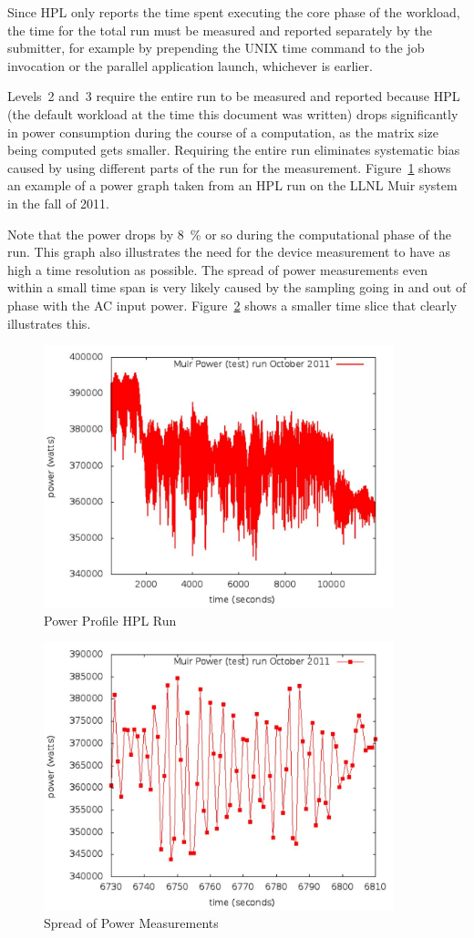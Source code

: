Since HPL only reports the time spent executing the core phase of the workload, the time for the total run must be measured and reported separately by the submitter, for example by prepending the UNIX time command to the job invocation or the parallel application launch, whichever is earlier.

Levels~2 and~3 require the entire run to be measured and reported because HPL (the default workload at the time this document was written) drops significantly in power consumption during the course of a computation, as the matrix size being computed gets smaller.
Requiring the entire run eliminates systematic bias caused by using different parts of the run for the measurement.
Figure~\ref{fig:powprof} shows an example of a power graph taken from an HPL run on the LLNL Muir system in the fall of 2011.

Note that the power drops by \SI{8}{\percent} or so during the computational phase of the run.
This graph also illustrates the need for the device measurement to have as high a time resolution as possible.
The spread of power measurements even within a small time span is very likely caused by the sampling going in and out of phase with the AC input power.
Figure~\ref{fig:sopm} shows a smaller time slice that clearly illustrates this.


\begin{figure}
\centering
\includegraphics[width=4in]{fig3-1}
\caption{Power Profile HPL Run}
\label{fig:powprof}
\end{figure}

\begin{figure}
\centering
\includegraphics[width=4in]{fig3-2}
\caption{Spread of Power Measurements}
\label{fig:sopm}
\end{figure}

